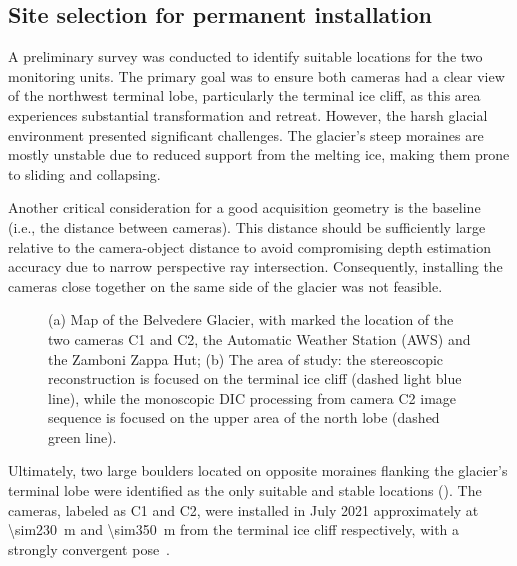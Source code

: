 \subsection{Site selection for permanent installation}\label{sec:4:siteselection}

A preliminary survey was conducted to identify suitable locations for the two monitoring units. 
The primary goal was to ensure both cameras had a clear view of the northwest terminal lobe, particularly the terminal ice cliff,
as this area experiences substantial transformation and retreat. 
However, the harsh glacial environment presented significant challenges. 
The glacier's steep moraines are mostly unstable due to reduced support from the melting ice, making them prone to sliding and collapsing.

Another critical consideration for a good acquisition geometry is the baseline (i.e., the distance between cameras). 
This distance should be sufficiently large relative to the camera-object distance to avoid compromising depth estimation accuracy due to narrow perspective ray intersection. 
Consequently, installing the cameras close together on the same side of the glacier was not feasible.

\begin{figure}
  \centering
  \caption{(a) Map of the Belvedere Glacier, with marked the location of the two cameras C1 and C2, the Automatic Weather Station (AWS) and the Zamboni Zappa Hut;
  (b) The area of study: the stereoscopic reconstruction is focused on the terminal ice cliff (dashed light blue line), while the monoscopic DIC processing from camera C2 image sequence is focused on the upper area of the north lobe (dashed green line).}
  \label{fig:4:studyarea}
\end{figure}

Ultimately, two large boulders located on opposite moraines flanking the glacier's terminal lobe were identified as the only suitable and stable locations ().
The cameras, labeled as C1 and C2, were installed in July 2021 approximately at \SI{\sim230}{\meter} and \SI{\sim350}{\meter} from the terminal ice cliff respectively, with a strongly convergent pose~.

